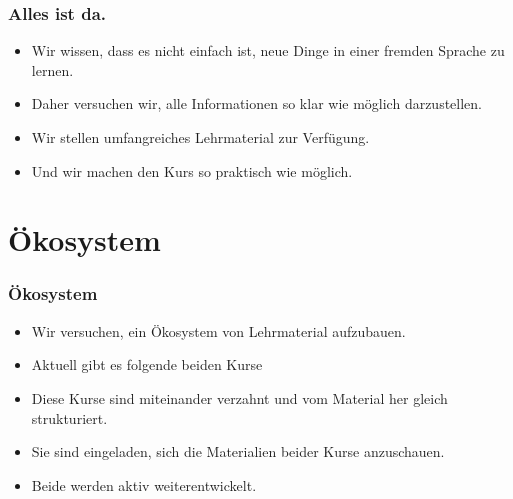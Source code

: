 \documentclass[aspectratio=169,mathserif,notheorems]{beamer}%
\begin{document}
%
\begin{frame}%
\frametitle{Alles ist da.}%
\begin{itemize}%
\item Wir wissen, dass es nicht einfach ist, neue Dinge in einer fremden Sprache zu lernen.%
\item<2-> Daher versuchen wir, alle Informationen so klar wie möglich darzustellen.%
\item<3-> Wir stellen umfangreiches Lehrmaterial zur Verfügung.%
\item<4-> Und wir machen den Kurs so praktisch wie möglich.%
\end{itemize}%
\end{frame}%
%
\section{Ökosystem}%
%
\begin{frame}%
\frametitle{Ökosystem}%
\begin{itemize}%
\item Wir versuchen, ein Ökosystem von Lehrmaterial aufzubauen.%
\item<2-> Aktuell gibt es folgende beiden Kurse%
\item<5-> Diese Kurse sind miteinander verzahnt und vom Material her gleich strukturiert.%
\item<6-> Sie sind eingeladen, sich die Materialien beider Kurse anzuschauen.%
\item<7-> Beide werden aktiv weiterentwickelt.%
\end{itemize}%
\end{frame}%
%
%
\end{document}
